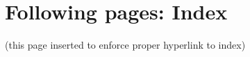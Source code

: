 \documentclass[12pt,a4paper,twoside,openany,titlepage,final]{book}
\begin{document}

%









\section*{Following pages: Index}
(this page inserted to enforce proper hyperlink to index)
\printindex
\end{document}
